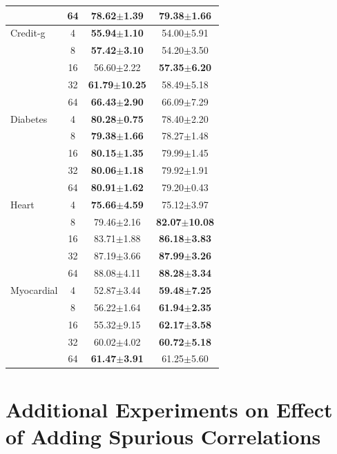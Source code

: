 \documentclass{article}
\theoremstyle{plain}
\theoremstyle{definition}
\theoremstyle{remark}
\begin{document}
\begin{table}[h!]
{\begin{tabular}{@{}l|c|cc@{}}
 & 64 & 78.62$\pm$1.39 & \textbf{79.38$\pm$1.66} \\ \midrule
Credit-g & 4 & \textbf{55.94$\pm$1.10} & 54.00$\pm$5.91 \\
 & 8 & \textbf{57.42$\pm$3.10} & 54.20$\pm$3.50 \\
 & 16 & 56.60$\pm$2.22 & \textbf{57.35$\pm$6.20} \\
 & 32 & \textbf{61.79$\pm$10.25} & 58.49$\pm$5.18 \\
 & 64 & \textbf{66.43$\pm$2.90} & 66.09$\pm$7.29 \\ \midrule
Diabetes & 4 & \textbf{80.28$\pm$0.75} & 78.40$\pm$2.20 \\
 & 8 & \textbf{79.38$\pm$1.66} & 78.27$\pm$1.48 \\
 & 16 & \textbf{80.15$\pm$1.35} & 79.99$\pm$1.45 \\
 & 32 & \textbf{80.06$\pm$1.18} & 79.92$\pm$1.91 \\
 & 64 & \textbf{80.91$\pm$1.62} & 79.20$\pm$0.43 \\ \midrule
Heart & 4 & \textbf{75.66$\pm$4.59} & 75.12$\pm$3.97 \\
 & 8 & 79.46$\pm$2.16 & \textbf{82.07$\pm$10.08} \\
 & 16 & 83.71$\pm$1.88 & \textbf{86.18$\pm$3.83} \\
 & 32 & 87.19$\pm$3.66 & \textbf{87.99$\pm$3.26} \\
 & 64 & 88.08$\pm$4.11 & \textbf{88.28$\pm$3.34} \\ \midrule
Myocardial & 4 & 52.87$\pm$3.44 & \textbf{59.48$\pm$7.25} \\
 & 8 & 56.22$\pm$1.64 & \textbf{61.94$\pm$2.35} \\
 & 16 & 55.32$\pm$9.15 & \textbf{62.17$\pm$3.58} \\
 & 32 & 60.02$\pm$4.02 & \textbf{60.72$\pm$5.18} \\
 & 64 & \textbf{61.47$\pm$3.91} & 61.25$\pm$5.60 \\ \bottomrule
\end{tabular}}
\label{tab:appendix-differentLLM}
\end{table}

\newpage

\section{Additional Experiments on Effect of Adding Spurious Correlations}
\label{sec:spurious-appendix}
\end{document}
